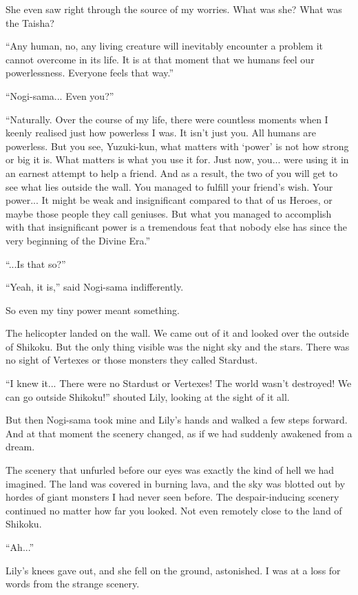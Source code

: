 She even saw right through the source of my worries. What was she? What was the Taisha?

``Any human, no, any living creature will inevitably encounter a problem it cannot overcome in its life. It is at that moment that we humans feel our powerlessness. Everyone feels that way.''

``Nogi-sama... Even you?''

``Naturally. Over the course of my life, there were countless moments when I keenly realised just how powerless I was. It isn't just you. All humans are powerless. But you see, Yuzuki-kun, what matters with `power' is not how strong or big it is. What matters is what you use it for. Just now, you... were using it in an earnest attempt to help a friend. And as a result, the two of you will get to see what lies outside the wall. You managed to fulfill your friend's wish. Your power... It might be weak and insignificant compared to that of us Heroes, or maybe those people they call geniuses. But what you managed to accomplish with that insignificant power is a tremendous feat that nobody else has since the very beginning of the Divine Era.''

``...Is that so?''

``Yeah, it is,'' said Nogi-sama indifferently.

So even my tiny power meant something.

The helicopter landed on the wall. We came out of it and looked over the outside of Shikoku. But the only thing visible was the night sky and the stars. There was no sight of Vertexes or those monsters they called Stardust.

``I knew it... There were no Stardust or Vertexes! The world wasn't destroyed! We can go outside Shikoku!'' shouted Lily, looking at the sight of it all.

But then Nogi-sama took mine and Lily's hands and walked a few steps forward. And at that moment the scenery changed, as if we had suddenly awakened from a dream.

The scenery that unfurled before our eyes was exactly the kind of hell we had imagined. The land was covered in burning lava, and the sky was blotted out by hordes of giant monsters I had never seen before. The despair-inducing scenery continued no matter how far you looked. Not even remotely close to the land of Shikoku.

``Ah...''

Lily's knees gave out, and she fell on the ground, astonished. I was at a loss for words from the strange scenery.

